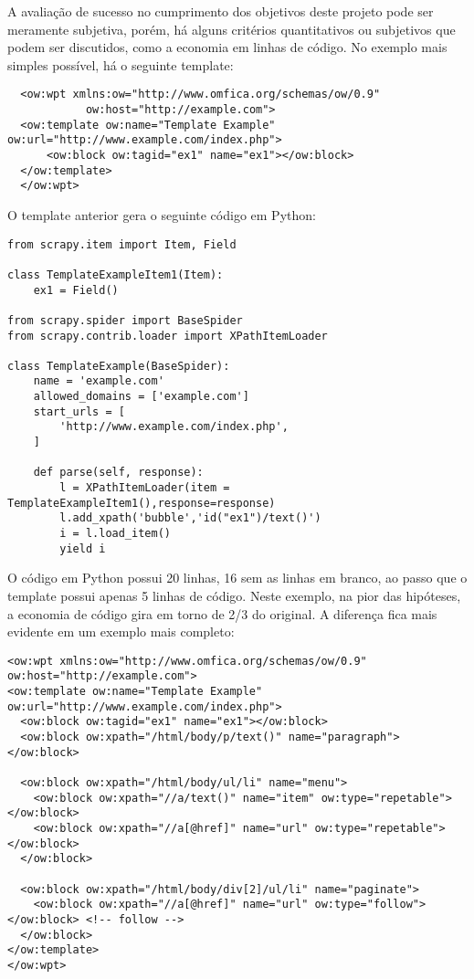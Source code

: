 A avaliação de sucesso no cumprimento dos objetivos deste projeto pode ser meramente subjetiva, porém, há alguns critérios quantitativos ou subjetivos que podem ser discutidos, como a economia em linhas de código. No exemplo mais simples possível, há o seguinte template:

\begin{lstlisting}
  <ow:wpt xmlns:ow="http://www.omfica.org/schemas/ow/0.9"
            ow:host="http://example.com">
  <ow:template ow:name="Template Example" ow:url="http://www.example.com/index.php">
      <ow:block ow:tagid="ex1" name="ex1"></ow:block>
  </ow:template> 
  </ow:wpt>
\end{lstlisting}

O template anterior gera o seguinte código em Python:

\begin{lstlisting}
from scrapy.item import Item, Field

class TemplateExampleItem1(Item):
    ex1 = Field()

from scrapy.spider import BaseSpider
from scrapy.contrib.loader import XPathItemLoader

class TemplateExample(BaseSpider):
    name = 'example.com'
    allowed_domains = ['example.com']
    start_urls = [
        'http://www.example.com/index.php',
    ]
    
    def parse(self, response):
        l = XPathItemLoader(item = TemplateExampleItem1(),response=response)
        l.add_xpath('bubble','id("ex1")/text()') 
        i = l.load_item()
        yield i
\end{lstlisting}

O código em Python possui 20 linhas, 16 sem as linhas em branco, ao passo que o template possui apenas 5 linhas de código. Neste exemplo, na pior das hipóteses, a economia de código gira em torno de 2/3 do original. A diferença fica mais evidente em um exemplo mais completo:

\begin{lstlisting}
<ow:wpt xmlns:ow="http://www.omfica.org/schemas/ow/0.9"
ow:host="http://example.com">
<ow:template ow:name="Template Example" ow:url="http://www.example.com/index.php">
  <ow:block ow:tagid="ex1" name="ex1"></ow:block>
  <ow:block ow:xpath="/html/body/p/text()" name="paragraph"></ow:block>
  
  <ow:block ow:xpath="/html/body/ul/li" name="menu">
    <ow:block ow:xpath="//a/text()" name="item" ow:type="repetable"></ow:block>
    <ow:block ow:xpath="//a[@href]" name="url" ow:type="repetable"></ow:block>
  </ow:block>
  
  <ow:block ow:xpath="/html/body/div[2]/ul/li" name="paginate">
    <ow:block ow:xpath="//a[@href]" name="url" ow:type="follow"></ow:block> <!-- follow -->
  </ow:block>
</ow:template> 
</ow:wpt>
\end{lstlisting}

